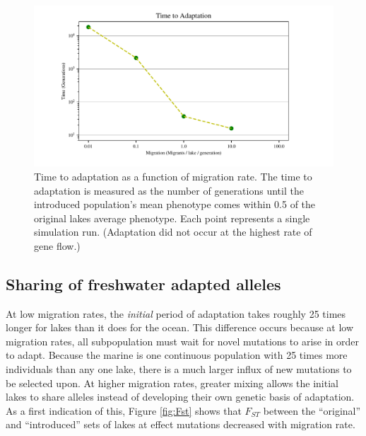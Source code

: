 \documentclass{article}
\begin{document}
\begin{figure}
	\begin{center}
  		\includegraphics{Final_Plots/Time_Adapt.pdf}
  		\caption{
		Time to adaptation as a function of migration rate.
        		The time to adaptation is measured as the number of generations until
		the introduced population's mean phenotype 
        		comes within 0.5 of the original lakes average phenotype. 
		Each point represents a single simulation run.
        		(Adaptation did not occur at the highest rate of gene flow.)
        } \label{fig:TimeToAdaptation}
	\end{center}
\end{figure}

\subsection*{Sharing of freshwater adapted alleles}

At low migration rates, the \emph{initial} period of adaptation
takes roughly 25 times longer for lakes than it does for the ocean.
This difference occurs because at low migration rates,
all subpopulation must wait for novel mutations to arise in order to adapt.
Because the marine is one continuous population with 25 times more individuals than any one lake, 
there is a much larger influx of new mutations to be selected upon. 
At higher migration rates, greater mixing
allows the initial lakes to share alleles instead of developing their own genetic basis of adaptation. 
As a first indication of this, Figure \ref{fig:Fst} 
shows that $F_{ST}$ between the ``original'' and ``introduced'' sets of lakes 
at effect mutations decreased with migration rate.
\end{document}
